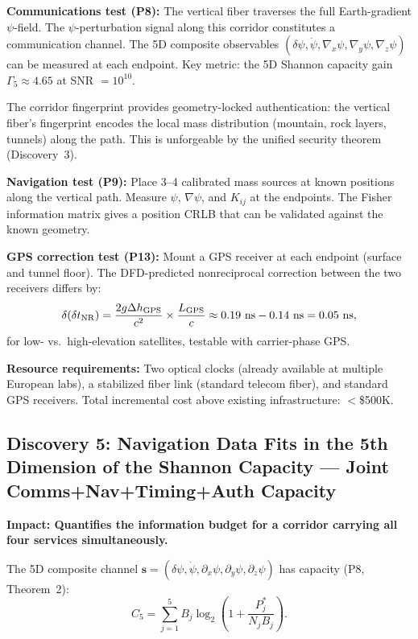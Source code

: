 \documentclass[aps,prd,twocolumn,superscriptaddress,nofootinbib]{revtex4-2}
\begin{document}
\textbf{Communications test (P8):}  The vertical fiber traverses the
full Earth-gradient $\psi$-field.  The $\psi$-perturbation signal along
this corridor constitutes a communication channel.  The 5D composite
observables $(\delta\psi, \dot\psi, \nabla_x\psi, \nabla_y\psi, \nabla_z\psi)$
can be measured at each endpoint.  Key metric: the 5D Shannon capacity
gain $\Gamma_5 \approx 4.65$ at SNR $= 10^{10}$.

The corridor fingerprint provides geometry-locked authentication: the
vertical fiber's fingerprint encodes the local mass distribution
(mountain, rock layers, tunnels) along the path.  This is unforgeable
by the unified security theorem (Discovery~3).

\textbf{Navigation test (P9):}  Place 3--4 calibrated mass sources
at known positions along the vertical path.  Measure $\psi$, $\nabla\psi$,
and $K_{ij}$ at the endpoints.  The Fisher information matrix gives a
position CRLB that can be validated against the known geometry.

\textbf{GPS correction test (P13):}  Mount a GPS receiver at each
endpoint (surface and tunnel floor).  The DFD-predicted nonreciprocal
correction between the two receivers differs by:
\begin{equation}
\delta(\delta t_{\rm NR}) = \frac{2g\Delta h_{\rm GPS}}{c^2}
\times\frac{L_{\rm GPS}}{c} \approx 0.19~\text{ns} - 0.14~\text{ns}
= 0.05~\text{ns},
\end{equation}
for low- vs.\ high-elevation satellites, testable with carrier-phase
GPS.

\textbf{Resource requirements:}  Two optical clocks (already available
at multiple European labs), a stabilized fiber link (standard
telecom fiber), and standard GPS receivers.  Total incremental cost
above existing infrastructure: $<$\$500K.

\subsection{Discovery 5: Navigation Data Fits in the 5th Dimension of
the Shannon Capacity --- Joint Comms+Nav+Timing+Auth Capacity}

\textbf{Impact: Quantifies the information budget for a corridor carrying
all four services simultaneously.}

The 5D composite channel
$\mathbf{s} = (\delta\psi, \dot\psi, \partial_x\psi, \partial_y\psi, \partial_z\psi)$
has capacity (P8, Theorem~2):
\begin{equation}
C_5 = \sum_{j=1}^{5}B_j\log_2\left(1 + \frac{P_j^*}{N_j B_j}\right).
\end{equation}
\end{document}
